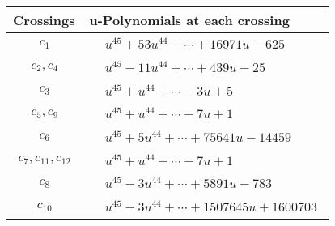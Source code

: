 \documentclass[1p]{elsarticle_modified}
\theoremstyle{definition}
\begin{document}
\begin{tabular}{m{50pt}|m{274pt}}
Crossings & \hspace{64pt}u-Polynomials at each crossing \\
\hline $$\begin{aligned}c_{1}\end{aligned}$$&$\begin{aligned}
&u^{45}+53 u^{44}+\cdots+16971 u-625
\end{aligned}$\\
\hline $$\begin{aligned}c_{2},c_{4}\end{aligned}$$&$\begin{aligned}
&u^{45}-11 u^{44}+\cdots+439 u-25
\end{aligned}$\\
\hline $$\begin{aligned}c_{3}\end{aligned}$$&$\begin{aligned}
&u^{45}+u^{44}+\cdots-3 u+5
\end{aligned}$\\
\hline $$\begin{aligned}c_{5},c_{9}\end{aligned}$$&$\begin{aligned}
&u^{45}+u^{44}+\cdots-7 u+1
\end{aligned}$\\
\hline $$\begin{aligned}c_{6}\end{aligned}$$&$\begin{aligned}
&u^{45}+5 u^{44}+\cdots+75641 u-14459
\end{aligned}$\\
\hline $$\begin{aligned}c_{7},c_{11},c_{12}\end{aligned}$$&$\begin{aligned}
&u^{45}+u^{44}+\cdots-7 u+1
\end{aligned}$\\
\hline $$\begin{aligned}c_{8}\end{aligned}$$&$\begin{aligned}
&u^{45}-3 u^{44}+\cdots+5891 u-783
\end{aligned}$\\
\hline $$\begin{aligned}c_{10}\end{aligned}$$&$\begin{aligned}
&u^{45}-3 u^{44}+\cdots+1507645 u+1600703
\end{aligned}$\\
\hline
\end{tabular}\\~\\
\end{document}
